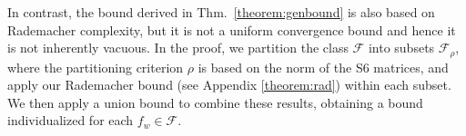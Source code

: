 In contrast, the bound derived in Thm.~\ref{theorem:genbound} is also based on Rademacher complexity, but it is not a uniform convergence bound and hence it is not inherently vacuous. In the proof, we partition the class $\mathcal{F}$ into subsets $\mathcal{F}_{\rho}$, where the partitioning criterion $\rho$ is based on the norm of the S6 matrices, and apply our Rademacher bound (see Appendix \ref{theorem:rad}) %
within each subset. We then apply a union bound to combine these results, obtaining a bound %
individualized for each $f_w \in \mathcal{F}$. 


